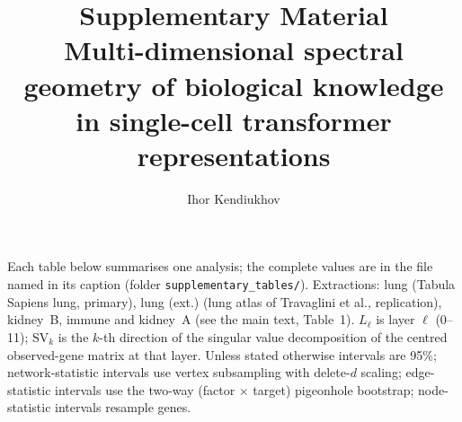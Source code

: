 \documentclass[10pt,a4paper]{article}
\title{\bfseries Supplementary Material\\[4pt]\large Multi-dimensional spectral geometry of biological knowledge in single-cell transformer representations}
\author{Ihor Kendiukhov}
\date{}
\newcommand{\SV}[1]{\mathrm{SV}_{#1}}
\begin{document}
\maketitle
Each table below summarises one analysis; the complete values are in the file named in its caption (folder \texttt{supplementary\_tables/}).
Extractions: lung (Tabula Sapiens lung, primary), lung (ext.) (lung atlas of Travaglini et al., replication), kidney~B, immune and kidney~A
(see the main text, Table~1). $L_\ell$ is layer $\ell$ (0--11); $\SV{k}$ is the $k$-th direction of the singular value decomposition of the centred
observed-gene matrix at that layer. Unless stated otherwise intervals are 95\%; network-statistic intervals use vertex subsampling with delete-$d$
scaling; edge-statistic intervals use the two-way (factor $\times$ target) pigeonhole bootstrap; node-statistic intervals resample genes.















\end{document}
